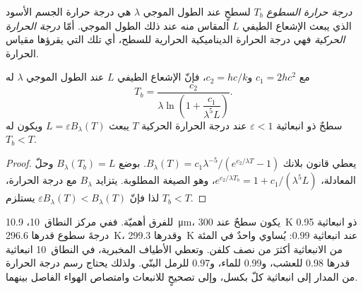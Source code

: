 \begin{definition}\label{def:b3:remote-sensing-gis:brightness}
\emph{درجة حرارة السطوع} $T_b$ لسطحٍ
عند الطول الموجي $\lambda$ هي درجة حرارة الجسم الأسود
الذي يبعث الإشعاع الطيفي $L$ المقاس منه عند ذلك
الطول الموجي. أمّا \emph{درجة الحرارة الحركية} فهي درجة الحرارة الديناميكية الحرارية للسطح،
أي تلك التي يقرؤها مقياس الحرارة.
\end{definition}

\begin{proposition}\label{prop:b3:remote-sensing-gis:planck-inversion}
مع $c_1 = 2hc^2$ و$c_2 = hc/k$، فإنّ الإشعاع الطيفي $L$ عند
الطول الموجي $\lambda$ له 
\[
T_b = \frac{c_2}{\lambda \ln\!\left(1 + \dfrac{c_1}{\lambda^5 L}\right)} .
\]
سطحٌ ذو انبعاثية $\varepsilon < 1$ عند درجة الحرارة الحركية $T$
يبعث $L = \varepsilon B_\lambda(T)$ ويكون له $T_b < T$.
\end{proposition}

\begin{proof}
يعطي قانون بلانك $B_\lambda(T) = c_1\lambda^{-5}/(e^{c_2/\lambda T} -
1)$. بوضع $B_\lambda(T_b) = L$ وحلّ المعادلة، $e^{c_2/\lambda T_b} = 1 +
c_1/(\lambda^5L)$، وهو الصيغة المطلوبة. يتزايد $B_\lambda$ مع
درجة الحرارة، لذا فإنّ $\varepsilon B_\lambda(T) < B_\lambda(T)$ يستلزم $T_b < T$.
\end{proof}

للفرق أهميّة. ففي مركز النطاق~10، \qty{10.9}{\micro\metre}،
يكون سطحٌ عند \qty{300}{K} ذو انبعاثية 0.95 درجةَ سطوع
قدرها \qty{296.6}{K}، وقدرها \qty{299.3}{K} عند انبعاثية 0.99: يُساوي واحدٌ في المئة من
الانبعاثية أكثرَ من نصف كلفن. وتعطي الأطياف المخبرية،
في النطاق~10 انبعاثية قدرها 0.98 للعشب، و0.99 للماء،
و0.97 للرمل البنّي. ولذلك يحتاج رسم درجة الحرارة من المدار إلى
انبعاثية كلّ بكسل، وإلى تصحيحٍ للانبعاث وامتصاص الهواء
الفاصل بينهما.

